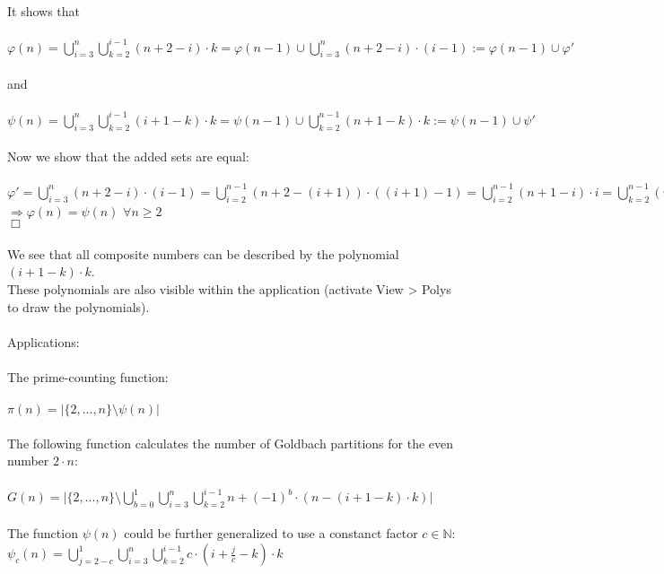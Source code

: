 \documentclass[12pt,ngerman]{article}
\theoremstyle{definition}
\begin{document}
It shows that\\\\
$\varphi(n) = \bigcup\limits_{i = 3}^{n} \bigcup\limits_{k = 2}^{i-1} (n+2-i) \cdot k = \varphi(n-1) \cup \bigcup\limits_{i = 3}^{n} (n+2-i) \cdot (i-1) := \varphi(n-1) \cup \varphi'$\\\\
and\\\\
$\psi(n) = \bigcup\limits_{i = 3}^{n} \bigcup\limits_{k = 2}^{i-1} (i+1-k) \cdot k = \psi(n-1) \cup \bigcup\limits_{k = 2}^{n-1} (n+1-k) \cdot k := \psi(n-1) \cup \psi'$\\\\
Now we show that the added sets are equal:\\\\
$\varphi' = \bigcup\limits_{i = 3}^{n} (n+2-i) \cdot (i-1) = \bigcup\limits_{i = 2}^{n-1} (n+2-(i+1)) \cdot ((i+1)-1) = \bigcup\limits_{i = 2}^{n-1} (n+1-i) \cdot i = \bigcup\limits_{k = 2}^{n-1} (n+1-k) \cdot k = \psi'$\\
$\Rightarrow \varphi(n) = \psi(n)$ $\forall n \geq 2$\\
$\Box$\\\\
We see that all composite numbers can be described by the polynomial $(i+1-k) \cdot k$.\\
These polynomials are also visible within the application (activate View > Polys to draw the  polynomials).\\\\
Applications:\\\\
The prime-counting function:\\\\
$\pi(n) = \vert \{2,...,n\} \setminus \psi(n) \vert$\\\\
The following function calculates the number of Goldbach partitions for the even number $2 \cdot n$:\\\\
$G(n) = \vert \{2,...,n\} \setminus \bigcup\limits_{b = 0}^{1} \bigcup\limits_{i = 3}^{n} \bigcup\limits_{k = 2}^{i-1} n + (-1)^b \cdot (n - (i + 1 - k) \cdot k) \vert$\\\\
The function $\psi(n)$ could be further generalized to use a constanct factor $c \in \mathbb{N}$:\\
$\psi_c(n) = \bigcup\limits_{j = 2-c}^{1} \bigcup\limits_{i = 3}^{n} \bigcup\limits_{k = 2}^{i-1} c \cdot (i + \frac{j}{c} - k) \cdot k$\\\\
\end{document}
